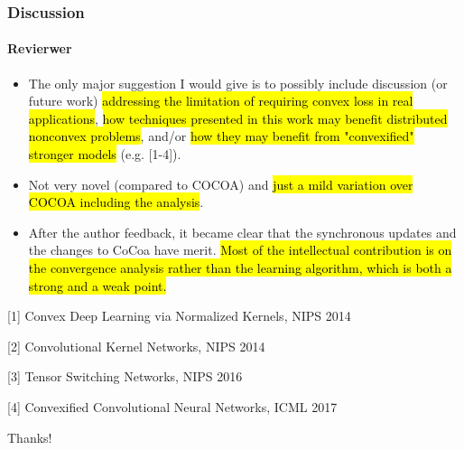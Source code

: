 \documentclass[UTF8,aspectratio=169,presentation]{ctexbeamer}
\makeatletter
\let\HL\hl
\renewcommand\hl{%
  \let\set@color\beamerorig@set@color
  \let\reset@color\beamerorig@reset@color
  \HL}
\makeatother
\begin{document}
\begin{frame}[t]
  \frametitle{Discussion}
  \framesubtitle{Revierwer}

  \begin{itemize}
  \item The only major suggestion I would give is to possibly include discussion (or future work) \hl{addressing the limitation of requiring convex loss in real applications}, \hl{how techniques presented in this work may benefit distributed nonconvex problems}, and/or \hl{how they may benefit from "convexified" stronger models} (e.g. [1-4]).
  \item Not very novel (compared to COCOA) and \hl{just a mild variation over COCOA including the analysis}.
  \item After the author feedback, it became clear that the synchronous updates and the changes to CoCoa have merit. \hl{Most of the intellectual contribution is on the convergence analysis rather than the learning algorithm, which is both a strong and a weak point.}

  \end{itemize}

[1] Convex Deep Learning via Normalized Kernels, NIPS 2014

[2] Convolutional Kernel Networks, NIPS 2014

[3] Tensor Switching Networks, NIPS 2016

[4] Convexified Convolutional Neural Networks, ICML 2017
\end{frame}

\begin{frame}[c]

  Thanks!
  
\end{frame}
\end{document}
